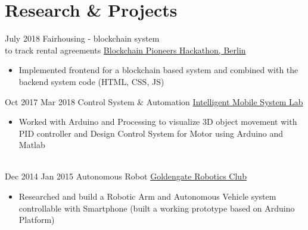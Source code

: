 \documentclass[letterpaper]{twentysecondcv} %
\begin{document}
\section{Research \& Projects}
\begin{twenty}
    \twentyitem
        {July 2018}
        {}
        {Fairhousing - blockchain system \\to track rental agreements}
          {\href{https://berlin.impacthub.net/consultancy/our-offer/community-and-ecosystem-building/blockch8n-pioneers-hackathon/}{Blockchain Pioneers Hackathon, Berlin}}
        {
        {\begin{itemize}
            \item Implemented frontend for a blockchain based system and combined with the backend system code (HTML, CSS, JS)\\
        \end{itemize}}
        }

    \twentyitem
        {Oct 2017}
        {Mar 2018}
        {Control System \& Automation }
        {\href{http://imsys.user.jacobs-university.de}{Intelligent Mobile System Lab}}
        {
        {\begin{itemize}
            \item Worked with Arduino and Processing to visualize 3D object movement with PID controller and Design Control System for Motor using Arduino and Matlab\\
            
            \\
        \end{itemize}}
        }
        
    \twentyitem
        {Dec 2014}
        {Jan 2015}
        {Autonomous Robot }
        {\href{}{Goldengate Robotics Club}}
        {
        {\begin{itemize}
            \item Researched and build a Robotic Arm and Autonomous Vehicle system controllable with Smartphone (built a working prototype based on Arduino Platform)\\
        \end{itemize}}
        }

\end{twenty}
\end{document}
